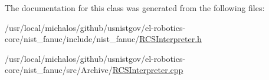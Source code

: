 The documentation for this class was generated from the following files\-:\begin{DoxyCompactItemize}
\item 
/usr/local/michalos/github/usnistgov/el-\/robotics-\/core/nist\-\_\-fanuc/include/nist\-\_\-fanuc/\hyperlink{RCSInterpreter_8h}{R\-C\-S\-Interpreter.\-h}\item 
/usr/local/michalos/github/usnistgov/el-\/robotics-\/core/nist\-\_\-fanuc/src/\-Archive/\hyperlink{Archive_2RCSInterpreter_8cpp}{R\-C\-S\-Interpreter.\-cpp}\end{DoxyCompactItemize}
